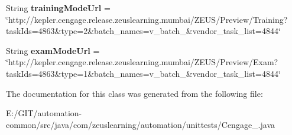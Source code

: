 \begin{DoxyCompactItemize}
String {\bfseries training\+Mode\+Url} = \char`\"{}http\+://kepler.\+cengage.\+release.\+zeuslearning.\+mumbai/Z\+E\+US/Preview/Training?task\+Ids=4863\&type=2\&batch\+\_\+names=v\+\_\+batch\+\_\&vendor\+\_\+task\+\_\+list=4844\char`\"{}
\item 
\hypertarget{classcom_1_1zeuslearning_1_1automation_1_1unittests_1_1Cengage__4844_a3a52d5977afe05de56242b2baa260d86}{}\label{classcom_1_1zeuslearning_1_1automation_1_1unittests_1_1Cengage__4844_a3a52d5977afe05de56242b2baa260d86} 
String {\bfseries exam\+Mode\+Url} = \char`\"{}http\+://kepler.\+cengage.\+release.\+zeuslearning.\+mumbai/Z\+E\+US/Preview/Exam?task\+Ids=4863\&type=1\&batch\+\_\+names=v\+\_\+batch\+\_\&vendor\+\_\+task\+\_\+list=4844\char`\"{}
\end{DoxyCompactItemize}


The documentation for this class was generated from the following file\+:\begin{DoxyCompactItemize}
\item 
E\+:/\+G\+I\+T/automation-\/common/src/java/com/zeuslearning/automation/unittests/Cengage\+\_.\+java\end{DoxyCompactItemize}
